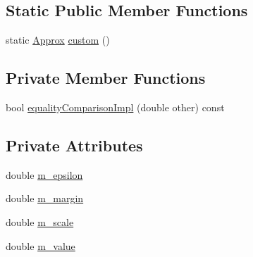 \subsection*{Static Public Member Functions}
\begin{DoxyCompactItemize}
\item 
static \hyperlink{class_catch_1_1_detail_1_1_approx}{Approx} \hyperlink{class_catch_1_1_detail_1_1_approx_aaf86dc0ee92272ac2d9839197a07951d}{custom} ()
\end{DoxyCompactItemize}
\subsection*{Private Member Functions}
\begin{DoxyCompactItemize}
\item 
bool \hyperlink{class_catch_1_1_detail_1_1_approx_a1ef0f66549a40d1b096aeb4ce685bf9a}{equality\-Comparison\-Impl} (double other) const 
\end{DoxyCompactItemize}
\subsection*{Private Attributes}
\begin{DoxyCompactItemize}
\item 
double \hyperlink{class_catch_1_1_detail_1_1_approx_af17c8e869ae7a55d14b99eb18e178114}{m\-\_\-epsilon}
\item 
double \hyperlink{class_catch_1_1_detail_1_1_approx_a4262a7e821eec507b424c335121ea0d8}{m\-\_\-margin}
\item 
double \hyperlink{class_catch_1_1_detail_1_1_approx_a65e9bdab9113ff3300b45f0a4e048dd7}{m\-\_\-scale}
\item 
double \hyperlink{class_catch_1_1_detail_1_1_approx_af7aeef703bd591f5ec85407b1dac053c}{m\-\_\-value}
\end{DoxyCompactItemize}
